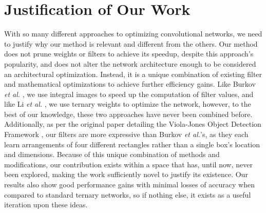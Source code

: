 \documentclass[11pt,a4paper,oldfontcommands]{memoir}
\begin{document}



\section{Justification of Our Work}
With so many different approaches to optimizing convolutional networks, we need to justify why our method is relevant and different from the others. Our method does not prune weights or filters to achieve its speedup, despite this approach's popularity, and does not alter the network architecture enough to be considered an architectural optimization. Instead, it is a unique combination of existing filter and mathematical optimizations to achieve further efficiency gains. Like Burkov \textit{et al.} \cite{BoxConv}, we use integral images to speed up the computation of filter values, and like Li \textit{et al.} \cite{ternary}, we use ternary weights to optimize the network, however, to the best of our knowledge, these two approaches have never been combined before. Additionally, as per the original paper detailing the Viola-Jones Object Detection Framework \cite{viola}, our filters are more expressive than Burkov \textit{et al.}'s, as they each learn arrangements of four different rectangles rather than a single box's location and dimensions. Because of this unique combination of methods and modifications, our contribution exists within a space that has, until now, never been explored, making the work sufficiently novel to justify its existence. Our results also show good performance gains with minimal losses of accuracy when compared to standard ternary networks, so if nothing else, it exists as a useful iteration upon these ideas. 
\end{document}
